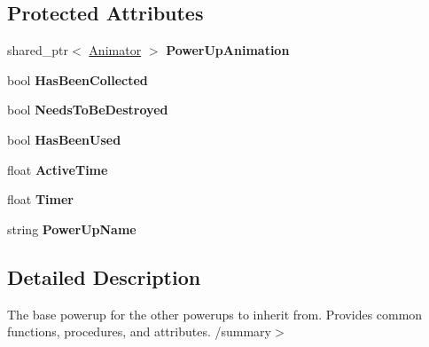 \subsection*{Protected Attributes}
\begin{DoxyCompactItemize}
\item 
\mbox{\label{class_engine_1_1_core_1_1_power_up_base_a1d6666dbc7e262d602657883ce47f37f}} 
shared\+\_\+ptr$<$ \hyperlink{class_engine_1_1_core_1_1_animator}{Animator} $>$ {\bfseries Power\+Up\+Animation}
\item 
\mbox{\label{class_engine_1_1_core_1_1_power_up_base_af8eee8047d8b8cc862cd2f2a7b478d7b}} 
bool {\bfseries Has\+Been\+Collected}
\item 
\mbox{\label{class_engine_1_1_core_1_1_power_up_base_a2bedbc9b886812f6817857b3de149c31}} 
bool {\bfseries Needs\+To\+Be\+Destroyed}
\item 
\mbox{\label{class_engine_1_1_core_1_1_power_up_base_a965113b66852a062cfc3c9c8c0311d76}} 
bool {\bfseries Has\+Been\+Used}
\item 
\mbox{\label{class_engine_1_1_core_1_1_power_up_base_ac31bcfc632da55934fb4a30ba6e45233}} 
float {\bfseries Active\+Time}
\item 
\mbox{\label{class_engine_1_1_core_1_1_power_up_base_a8584876cda80e9062ab45f8b0b8e8b31}} 
float {\bfseries Timer}
\item 
\mbox{\label{class_engine_1_1_core_1_1_power_up_base_a7639465b4ce58ded85e2853b31497424}} 
string {\bfseries Power\+Up\+Name}
\end{DoxyCompactItemize}


\subsection{Detailed Description}
The base powerup for the other powerups to inherit from. Provides common functions, procedures, and attributes. /summary$>$ 

